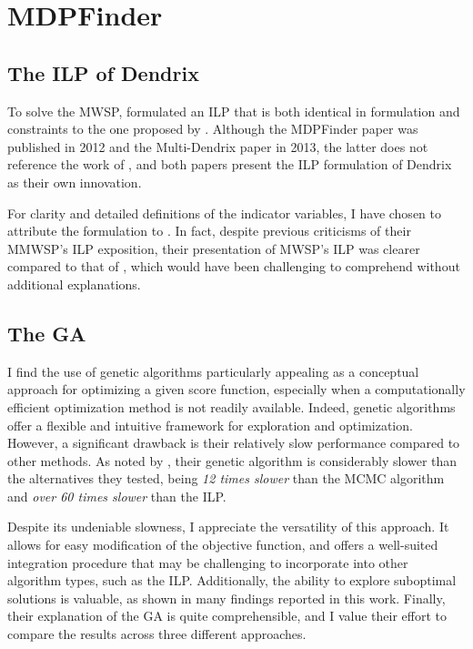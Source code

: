 \section{MDPFinder}

\subsection{The ILP of Dendrix}

To solve the MWSP, \textcite{mdpfinder} formulated an ILP that is both identical in formulation and constraints to the one proposed by \textcite{multi-dendrix}. Although the MDPFinder paper was published in 2012 and the Multi-Dendrix paper in 2013, the latter does not reference the work of \textcite{mdpfinder}, and both papers present the ILP formulation of Dendrix as their own innovation.

For clarity and detailed definitions of the indicator variables, I have chosen to attribute the formulation to \textcite{multi-dendrix}. In fact, despite previous criticisms of their MMWSP's ILP exposition, their presentation of MWSP's ILP was clearer compared to that of \textcite{mdpfinder}, which would have been challenging to comprehend without additional explanations.

\subsection{The GA}

I find the use of genetic algorithms particularly appealing as a conceptual approach for optimizing a given score function, especially when a computationally efficient optimization method is not readily available. Indeed, genetic algorithms offer a flexible and intuitive framework for exploration and optimization. However, a significant drawback is their relatively slow performance compared to other methods. As noted by \textcite{mdpfinder}, their genetic algorithm is considerably slower than the alternatives they tested, being \textit{12 times slower} than the MCMC algorithm and \textit{over 60 times slower} than the ILP.

Despite its undeniable slowness, I appreciate the versatility of this approach. It allows for easy modification of the objective function, and offers a well-suited integration procedure that may be challenging to incorporate into other algorithm types, such as the ILP. Additionally, the ability to explore suboptimal solutions is valuable, as shown in many findings reported in this work. Finally, their explanation of the GA is quite comprehensible, and I value their effort to compare the results across three different approaches.

\cleardoublepage

